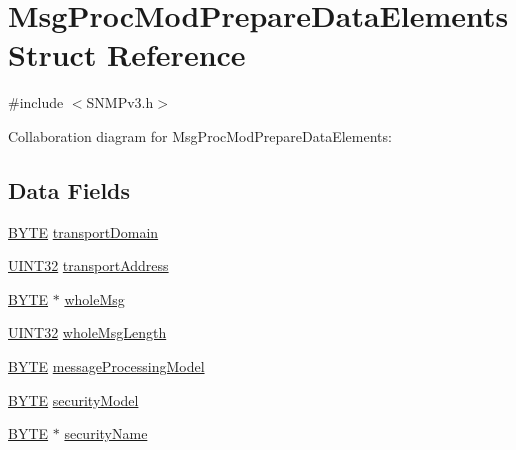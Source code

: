 \hypertarget{struct_msg_proc_mod_prepare_data_elements}{}\section{Msg\+Proc\+Mod\+Prepare\+Data\+Elements Struct Reference}
\label{struct_msg_proc_mod_prepare_data_elements}


{\ttfamily \#include $<$S\+N\+M\+Pv3.\+h$>$}



Collaboration diagram for Msg\+Proc\+Mod\+Prepare\+Data\+Elements\+:
\subsection*{Data Fields}
\begin{DoxyCompactItemize}
\item 
\hyperlink{_generic_type_defs_8h_a4ae1dab0fb4b072a66584546209e7d58}{B\+Y\+T\+E} \hyperlink{struct_msg_proc_mod_prepare_data_elements_a9caa74f4cfb6917bbf209d8f1de38a9f}{transport\+Domain}
\item 
\hyperlink{_generic_type_defs_8h_a1720f33f59b583f0c2ed071815623a86}{U\+I\+N\+T32} \hyperlink{struct_msg_proc_mod_prepare_data_elements_a4943d5b448452380d516089d6a59700c}{transport\+Address}
\item 
\hyperlink{_generic_type_defs_8h_a4ae1dab0fb4b072a66584546209e7d58}{B\+Y\+T\+E} $\ast$ \hyperlink{struct_msg_proc_mod_prepare_data_elements_a004e34c44705bf128556c60cca7a6586}{whole\+Msg}
\item 
\hyperlink{_generic_type_defs_8h_a1720f33f59b583f0c2ed071815623a86}{U\+I\+N\+T32} \hyperlink{struct_msg_proc_mod_prepare_data_elements_ae69530a979f1b7b71b437d128ffc63ff}{whole\+Msg\+Length}
\item 
\hyperlink{_generic_type_defs_8h_a4ae1dab0fb4b072a66584546209e7d58}{B\+Y\+T\+E} \hyperlink{struct_msg_proc_mod_prepare_data_elements_a47f1a1b8f7a3fe5623fe37df094ac032}{message\+Processing\+Model}
\item 
\hyperlink{_generic_type_defs_8h_a4ae1dab0fb4b072a66584546209e7d58}{B\+Y\+T\+E} \hyperlink{struct_msg_proc_mod_prepare_data_elements_ac19ed44216346e9d6c50819813db6867}{security\+Model}
\item 
\hyperlink{_generic_type_defs_8h_a4ae1dab0fb4b072a66584546209e7d58}{B\+Y\+T\+E} $\ast$ \hyperlink{struct_msg_proc_mod_prepare_data_elements_a4a48a8746988a1f761c3e9eadcc20463}{security\+Name}
\item 

\end{DoxyCompactItemize}
